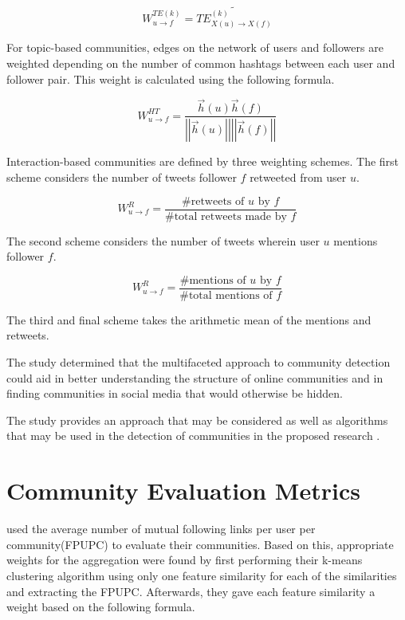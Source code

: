 \begin{equation}
W_{u \to f}^{TE(k)} = \tilde{TE_{X(u) \to X(f)}^{(k)}} 
\end{equation}

For topic-based communities, edges on the network of users and followers are weighted depending on the number of common hashtags between each user and follower pair. This weight is calculated using the following formula.

\begin{equation}
W_{u \to f}^{HT} = \frac{\vec{h}(u)\vec{h}(f)}{\left|{\left|{\vec{h}(u)}\right|}\right| \left|{\left|{\vec{h}(f)}\right|}\right|}
\end{equation}

Interaction-based communities are defined by three weighting schemes. The first scheme considers the number of tweets follower $f$ retweeted from user $u$.

\begin{equation}
W_{u \to f}^{R} = \frac{\text{\# retweets of $u$ by $f$}}{\text{\# total retweets made by $f$}}
\end{equation}

The second scheme considers the number of tweets wherein user $u$ mentions follower $f$.

\begin{equation}
W_{u \to f}^{R} = \frac{\text{\# mentions of $u$ by $f$}}{\text{\# total mentions of $f$}}
\end{equation}

The third and final scheme takes the arithmetic mean of the mentions and retweets.

The study determined that the multifaceted approach to community detection could aid in better understanding the structure of online communities and in finding communities in social media that would otherwise be hidden.

The study provides an approach that may be considered as well as algorithms that may be used in the detection of communities in the proposed research \cite{Darmon:2015}.

\section{Community Evaluation Metrics}

 used the average number of mutual following links per user per community(FPUPC) to evaluate their communities. Based on this, appropriate weights for the aggregation were found by first performing their k-means clustering algorithm using only one feature similarity for each of the similarities and extracting the FPUPC. Afterwards, they gave each feature similarity a weight based on the following formula. 

